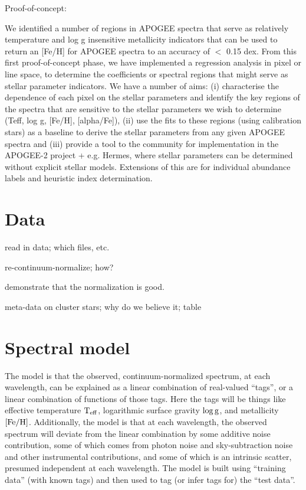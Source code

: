\documentclass[12pt, preprint]{aastex}
\newcommand{\teff}{\mbox{$\rm T_{eff}$}}
\newcommand{\feh}{\mbox{$\rm [Fe/H]$}}
\newcommand{\logg}{\mbox{$\rm \log g$}}
\begin{document}
Proof-of-concept: 

We identified a number of regions in APOGEE spectra that serve as relatively temperature and log g insensitive metallicity indicators that can be used to return an [Fe/H] for APOGEE spectra to an accuracy of $<$ 0.15 dex. From this first proof-of-concept phase, we have implemented a regression analysis in pixel or line space, to determine the coefficients or spectral regions that might serve as stellar parameter indicators.  We have a number of aims: (i) characterise the dependence of each pixel on the stellar parameters and identify the key regions of the spectra that are sensitive to the stellar parameters we wish to determine (Teff, log g, [Fe/H], [alpha/Fe]), (ii) use the fits to these regions (using calibration stars) as a baseline to derive the stellar parameters from any given APOGEE spectra and (iii) provide a tool to the community for implementation in the APOGEE-2 project + e.g. Hermes, where stellar parameters can be determined without explicit stellar models. Extensions of this are for individual abundance labels and heuristic index determination.

\section{Data}

read in data; which files, etc.

re-continuum-normalize; how?

demonstrate that the normalization is good.

meta-data on cluster stars; why do we believe it; table

\section{Spectral model}

The model is that the observed, continuum-normalized spectrum, at each
wavelength, can be explained as a linear combination of real-valued
``tags'', or a linear combination of functions of those tags.
Here the tags will be things like effective temperature $\teff$,
logarithmic surface gravity $\logg$, and metallicity $\feh$.
Additionally, the model is that at each wavelength, the observed
spectrum will deviate from the linear combination by some additive
noise contribution, some of which comes from photon noise and
sky-subtraction noise and other instrumental contributions, and some
of which is an intrinsic scatter, presumed independent at each
wavelength.
The model is built using ``training data'' (with known tags) and then
used to tag (or infer tags for) the ``test data''.
\end{document}
